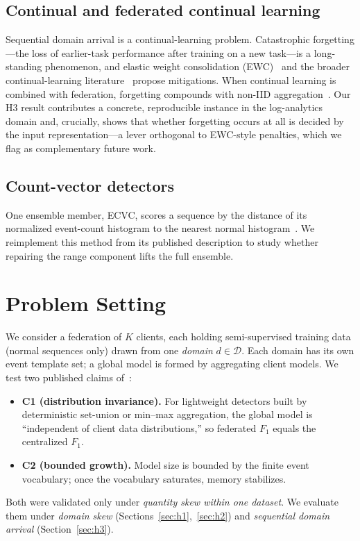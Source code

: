 \documentclass[journal]{IEEEtran}
\begin{document}
\subsection{Continual and federated continual learning}
Sequential domain arrival is a continual-learning problem. Catastrophic forgetting---the loss of
earlier-task performance after training on a new task---is a long-standing phenomenon, and elastic
weight consolidation (EWC)~\cite{kirkpatrick2017overcoming} and the broader continual-learning
literature~\cite{delange2022continual} propose mitigations. When continual learning is combined
with federation, forgetting compounds with non-IID aggregation~\cite{cfl2023quantifying}. Our H3
result contributes a concrete, reproducible instance in the log-analytics domain and, crucially,
shows that whether forgetting occurs at all is decided by the input representation---a lever
orthogonal to EWC-style penalties, which we flag as complementary future work.

\subsection{Count-vector detectors}
One ensemble member, ECVC, scores a sequence by the distance of its normalized event-count
histogram to the nearest normal histogram~\cite{ecvc2024}. We reimplement this method from its
published description to study whether repairing the range component lifts the full ensemble.

\section{Problem Setting}
We consider a federation of $K$ clients, each holding semi-supervised training data (normal
sequences only) drawn from one \emph{domain} $d\in\mathcal{D}$. Each domain has its own event
template set; a global model is formed by aggregating client models. We test two published claims
of~\cite{pustozerova2026lightweight}:
\begin{itemize}
\item \textbf{C1 (distribution invariance).} For lightweight detectors built by deterministic
set-union or min--max aggregation, the global model is ``independent of client data
distributions,'' so federated $F_1$ equals the centralized $F_1$.
\item \textbf{C2 (bounded growth).} Model size is bounded by the finite event vocabulary; once the
vocabulary saturates, memory stabilizes.
\end{itemize}
Both were validated only under \emph{quantity skew within one dataset}. We evaluate them under
\emph{domain skew} (Sections~\ref{sec:h1},~\ref{sec:h2}) and \emph{sequential domain arrival}
(Section~\ref{sec:h3}).
\end{document}

